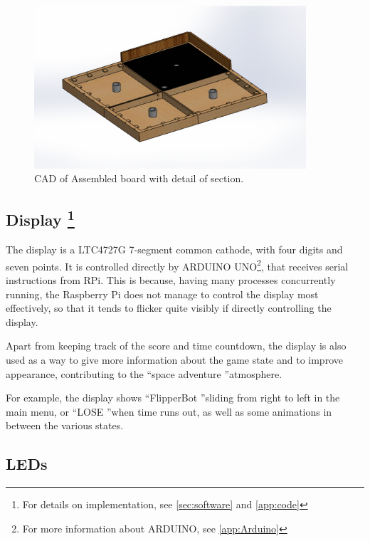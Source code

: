 \documentclass[a4paper,twoside]{book}
\begin{document}
\begin{figure}[h]
\centering
\includegraphics[width=0.9\textwidth]{img/Board.eps}
\caption{CAD of Assembled board with detail of section.}
\end{figure}

\subsection[Display]{Display \footnote{For details on implementation, see \autoref{sec:software} and \autoref{app:code}}}

The display is a LTC4727G 7-segment common cathode, with four digits and seven points. It is controlled directly by ARDUINO UNO\footnote{For more information about ARDUINO, see \autoref{app:Arduino}}, that receives serial instructions from RPi. This is because, having many processes concurrently running, the Raspberry Pi does not manage to control the display most effectively, so that it tends to flicker quite visibly if directly controlling the display.

Apart from keeping track of the score and time countdown, the display is also used as a way to give more information about the game state and to improve appearance, contributing to the \textquotedblleft space adventure \textquotedblright atmosphere.

For example, the display shows \textquotedblleft FlipperBot \textquotedblright sliding from right to left in the main menu, or \textquotedblleft LOSE \textquotedblright when time runs out, as well as some animations in between the various states.


\subsection{LEDs}
\end{document}
